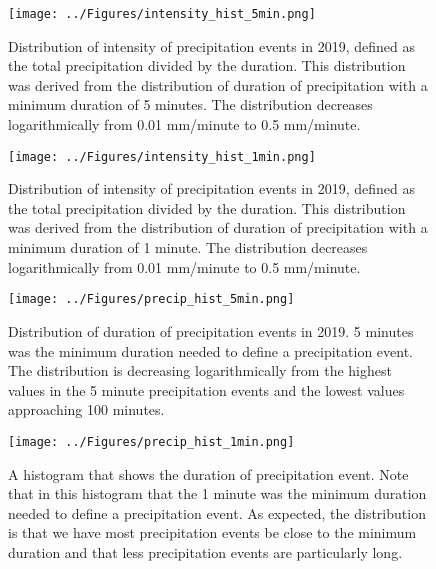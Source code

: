 %

\begin{figure}[h]
\centering
\texttt{[image: ../Figures/intensity\_hist\_5min.png]}
\caption{\label{abc}Distribution of intensity of precipitation events
  in 2019, defined as the total precipitation divided by the
  duration. This distribution was derived from the distribution of
  duration of precipitation with a minimum duration of 5 minutes. The
  distribution decreases logarithmically from 0.01 mm/minute to 0.5
  mm/minute.}
\end{figure}
\vfill
\begin{figure}[h]
\centering
\texttt{[image: ../Figures/intensity\_hist\_1min.png]}
\caption{\label{abcd}Distribution of intensity of precipitation events
  in 2019, defined as the total precipitation divided by the
  duration. This distribution was derived from the distribution of
  duration of precipitation with a minimum duration of 1 minute. The
  distribution decreases logarithmically from 0.01 mm/minute to 0.5
  mm/minute.}
\end{figure}
\vfill
\begin{figure}[h]
\centering
\texttt{[image: ../Figures/precip\_hist\_5min.png]} 
\caption{\label{abce}Distribution of duration of precipitation events
  in 2019. 5 minutes was the minimum duration needed to define a
  precipitation event. The distribution is decreasing logarithmically
  from the highest values in the 5 minute precipitation events and the
  lowest values approaching 100 minutes.}
\end{figure}
\begin{figure}[h]
\centering
\texttt{[image: ../Figures/precip\_hist\_1min.png]}
\caption{\label{abcf}A histogram that shows the duration of
  precipitation event. Note that in this histogram that the 1 minute
  was the minimum duration needed to define a precipitation event. As
  expected, the distribution is that we have most precipitation events
  be close to the minimum duration and that less precipitation events
  are particularly long. }
\end{figure}
